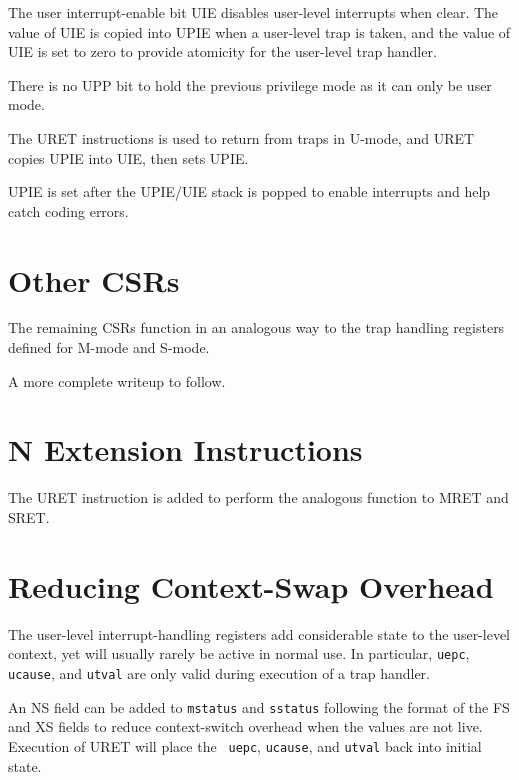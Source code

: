 The user interrupt-enable bit UIE disables user-level interrupts when
clear. The value of UIE is copied into UPIE when a user-level trap is
taken, and the value of UIE is set to zero to provide atomicity for
the user-level trap handler.

\begin{commentary}
  There is no UPP bit to hold the previous privilege mode as it can
  only be user mode.
\end{commentary}

The URET instructions is used to return from traps in U-mode, and URET
copies UPIE into UIE, then sets UPIE.
\begin{commentary}
  UPIE is set after the UPIE/UIE stack is popped to enable interrupts
  and help catch coding errors.
\end{commentary}

\section{Other CSRs}
The remaining CSRs function in an analogous way to the trap handling
registers defined for M-mode and S-mode.

\begin{commentary}
  A more complete writeup to follow.
\end{commentary}

\section{N Extension Instructions}

The URET instruction is added to perform the analogous function to
MRET and SRET.

\section{Reducing Context-Swap Overhead}

The user-level interrupt-handling registers add considerable state to
the user-level context, yet will usually rarely be active in normal
use.  In particular, {\tt uepc}, {\tt ucause}, and {\tt utval} are
only valid during execution of a trap handler.

An NS field can be added to {\tt mstatus} and {\tt sstatus} following
the format of the FS and XS fields to reduce context-switch overhead
when the values are not live.  Execution of URET will place the {\tt
  uepc}, {\tt ucause}, and {\tt utval} back into initial state.
